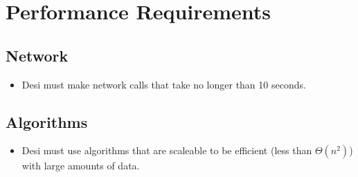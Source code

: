 \documentclass[11pt, a4paper]{report}
\begin{document}
\section{Performance Requirements}
\subsection{Network}
\begin{itemize}
\item Desi must make network calls that take no longer than 10 seconds.
\end{itemize}
\subsection{Algorithms}
\begin{itemize}
\item Desi must use algorithms that are scaleable to be efficient (less than $\Theta(n^2)$) with large amounts of data.
\end{itemize}
\end{document}
